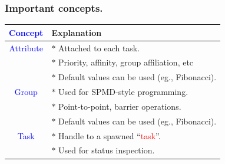 \documentclass{beamer}
\newcommand{\tablefont}{\fontsize{8}{13}\selectfont}
\begin{document}
\begin{frame}[fragile]
\frametitle{Important concepts.}
\begin{center}
\tablefont
\begin{tabular}{|c|l|}
\hline
\textcolor{blue}{Concept} & Explanation \\
\hline
\textcolor{blue}{Attribute} & $\ast{}$ Attached to each task. \\
          & $\ast{}$ Priority, affinity, group affiliation, etc \\
          & $\ast{}$ Default values can be used (eg., Fibonacci). \\
\hline
\textcolor{blue}{Group} & $\ast{}$ Used for SPMD-style programming. \\
      & $\ast{}$ Point-to-point, barrier operations. \\
      & $\ast{}$ Default values can be used (eg., Fibonacci). \\
\hline
\textcolor{blue}{Task} & $\ast{}$ Handle to a spawned ``\textcolor{red}{task}''. \\
     & $\ast{}$ Used for status inspection. \\
\hline
\end{tabular}
\end{center}
\end{frame}
\end{document}
